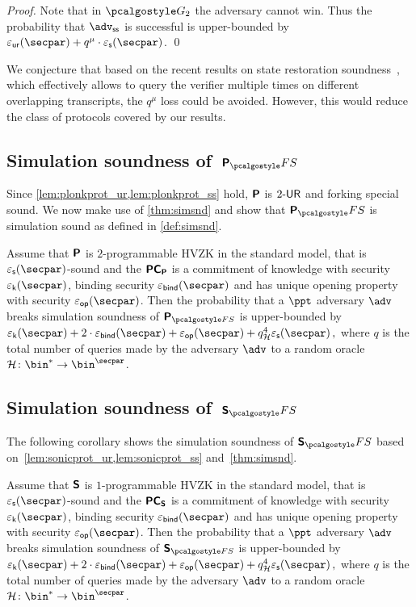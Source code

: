 \begin{proof}
	Note that in $\game{2}$ the adversary cannot win. Thus the probability
	that $\advss$ is successful is upper-bounded by
	$\epsur(\secpar) + q^{\mu} \cdot \epss(\secpar)$.  \qed
\end{proof}


We conjecture that based on the recent results on state restoration soundness~\cite{cryptoeprint:2020:1351}, which effectively allows to query the verifier multiple times on different overlapping transcripts, the $q^{\mu}$ loss could be avoided. However, this would reduce the class of protocols covered by our results. 


\subsection{Simulation soundness of~$\plonkprotfs$}
Since \cref{lem:plonkprot_ur,lem:plonkprot_ss} hold, $\bm{\mathsf{P}}$ is ${2\text{-}\mathsf{UR}}$
and forking special sound. We now make use of \cref{thm:simsnd} and show that
$\plonkprot_\fs$ is simulation sound as defined in
\cref{def:simsnd}.

 \begin{corollary}
   \label{cor:simsnd-P}
   Assume that $\bm{\mathsf{P}}$ is $2$-programmable HVZK in the standard model, that
   is $\epss(\secpar)$-sound and the $\bm{\mathsf{PC}}_{\bm{\mathsf{P}}}$ is a commitment of knowledge with
   security $\epsk(\secpar)$, binding security $\epsbind(\secpar)$ and has unique
   opening property with security $\epsop(\secpar)$. Then the probability that a
   $\ppt$ adversary $\adv$ breaks simulation soundness of $\plonkprot_{\fs}$ is
   upper-bounded by
   \( \epsk(\secpar) + 2\cdot\epsbind(\secpar) + \epsop(\secpar) + q_\ro^4
   \epss(\secpar)\,, \) where $q$ is the total number of queries made by the
   adversary $\adv$ to a random oracle $\ro\colon \bin^{*} \to \bin^{\secpar}$.
 \end{corollary}

\subsection{Simulation soundness of~$\sonicprotfs$}
The following corollary shows the simulation soundness of $\sonicprotfs$ based on~\cref{lem:sonicprot_ur,lem:sonicprot_ss} and~\cref{thm:simsnd}.
\begin{corollary}
	\label{cor:simsnd-S}
	Assume that $\bm{\mathsf{S}}$ is $1$-programmable HVZK in the standard model, that
	is $\epss(\secpar)$-sound and the $\bm{\mathsf{PC}}_{\bm{\mathsf{S}}}$ is a commitment of knowledge with
	security $\epsk(\secpar)$, binding security $\epsbind(\secpar)$ and has unique
	opening property with security $\epsop(\secpar)$. Then the probability that a
	$\ppt$ adversary $\adv$ breaks simulation soundness of $\sonicprot_{\fs}$ is
	upper-bounded by
	\( \epsk(\secpar) + 2\cdot\epsbind(\secpar) + \epsop(\secpar) + q_\ro^4
	\epss(\secpar)\,, \) where $q$ is the total number of queries made by the
	adversary $\adv$ to a random oracle $\ro\colon \bin^{*} \to \bin^{\secpar}$.
\end{corollary}

